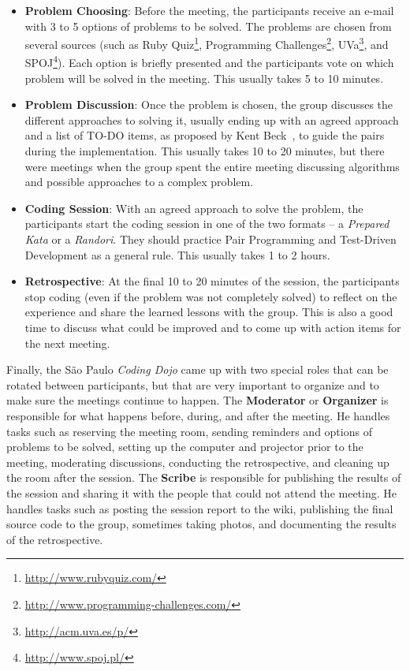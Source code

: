 \begin{itemize}
	\item \textbf{Problem Choosing}: Before the meeting, the participants receive an e-mail with 3 to 5 options
	of problems to be solved. The problems are chosen from several sources (such as Ruby 
	Quiz\footnote{\url{http://www.rubyquiz.com/}}, Programming
	Challenges\footnote{\url{http://www.programming-challenges.com/}}, UVa\footnote{\url{http://acm.uva.es/p/}},
	and SPOJ\footnote{\url{http://www.spoj.pl/}}). Each option is briefly presented and the participants vote
	on which problem will be solved in the meeting. This usually takes 5 to 10 minutes.
	
	\item \textbf{Problem Discussion}: Once the problem is chosen, the group discusses the different approaches
	to solving it, usually ending up with an agreed approach and a list of TO-DO items, as proposed by Kent
	Beck~\cite{TDD}, to guide the pairs during the implementation. This usually takes 10 to 20 minutes, but there
	were meetings when the group spent the entire meeting discussing algorithms and possible approaches to a
	complex problem.
	
	\item \textbf{Coding Session}: With an agreed approach to solve the problem, the participants start the
	coding session in one of the two formats -- a \emph{Prepared Kata} or a \emph{Randori}. They should practice
	Pair Programming and Test-Driven Development as a general rule. This usually takes 1 to 2 hours.
	
	\item \textbf{Retrospective}: At the final 10 to 20 minutes of the session, the participants stop coding
	(even if the problem was not completely solved) to reflect on the experience and share the learned lessons
	with the group. This is also a good time to discuss what could be improved and to come up with action items
	for the next meeting.
\end{itemize}

Finally, the São Paulo \emph{Coding Dojo} came up with two special roles that can be rotated between participants,
but that are very important to organize and to make sure the meetings continue to happen. The \textbf{Moderator}
or \textbf{Organizer} is responsible for what happens before, during, and after the meeting. He handles tasks
such as reserving the meeting room, sending reminders and options of problems to be solved, setting up the
computer and projector prior to the meeting, moderating discussions, conducting the retrospective, and cleaning
up the room after the session. The \textbf{Scribe} is responsible for publishing the results of the session and
sharing it with the people that could not attend the meeting. He handles tasks such as posting the session report
to the wiki, publishing the final source code to the group, sometimes taking photos, and documenting the results
of the retrospective.
